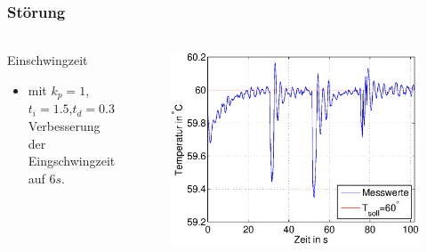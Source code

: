\begin{frame}
    \frametitle{Störung}
    \framesubtitle{}
    \begin{columns}[c]
            \begin{block}{Einschwingzeit}
                 \begin{itemize}
                     \item mit $k_p=1$,$t_i =1.5$,$t_d = 0.3$ Verbesserung der
                     Eingschwingzeit auf $6s$.
                 \end{itemize}
            \end{block}
        \begin{figure}[H]
        \begin{center}
                \includegraphics[scale=0.4]{./img/plots/2g_blow.eps}
        \end{center}
        \end{figure}
    \end{columns}   
\end{frame}
